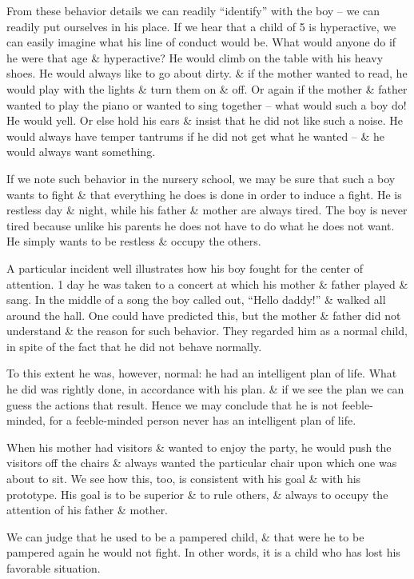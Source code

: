 \documentclass{article}
\begin{document}
From these behavior details we can readily ``identify'' with the boy -- we can readily put ourselves in his place. If we hear that a child of 5 is hyperactive, we can easily imagine what his line of conduct would be. What would anyone do if he were that age \& hyperactive? He would climb on the table with his heavy shoes. He would always like to go about dirty. \& if the mother wanted to read, he would play with the lights \& turn them on \& off. Or again if the mother \& father wanted to play the piano or wanted to sing together -- what would such a boy do! He would yell. Or else hold his ears \& insist that he did not like such a noise. He would always have temper tantrums if he did not get what he wanted -- \& he would always want something.

If we note such behavior in the nursery school, we may be sure that such a boy wants to fight \& that everything he does is done in order to induce a fight. He is restless day \& night, while his father \& mother are always tired. The boy is never tired because unlike his parents he does not have to do what he does not want. He simply wants to be restless \& occupy the others.

A particular incident well illustrates how his boy fought for the center of attention. 1 day he was taken to a concert at which his mother \& father played \& sang. In the middle of a song the boy called out, ``Hello daddy!'' \& walked all around the hall. One could have predicted this, but the mother \& father did not understand \& the reason for such behavior. They regarded him as a normal child, in spite of the fact that he did not behave normally.

To this extent he was, however, normal: he had an intelligent plan of life. What he did was rightly done, in accordance with his plan. \& if we see the plan we can guess the actions that result. Hence we may conclude that he is not feeble-minded, for a feeble-minded person never has an intelligent plan of life.

When his mother had visitors \& wanted to enjoy the party, he would push the visitors off the chairs \& always wanted the particular chair upon which one was about to sit. We see how this, too, is consistent with his goal \& with his prototype. His goal is to be superior \& to rule others, \& always to occupy the attention of his father \& mother.

We can judge that he used to be a pampered child, \& that were he to be pampered again he would not fight. In other words, it is a child who has lost his favorable situation.
\end{document}
